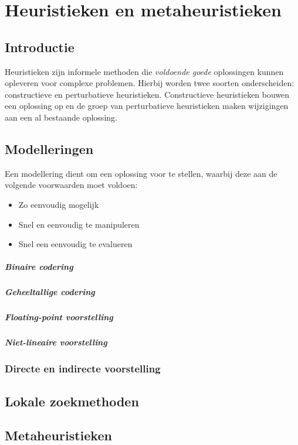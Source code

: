 \chapter{Heuristieken en metaheuristieken}

\section{Introductie}
Heuristieken zijn informele methoden die \emph{voldoende goede} oplossingen kunnen opleveren voor complexe problemen. 
Hierbij worden twee soorten onderscheiden: constructieve en perturbatieve heuristieken.
Constructieve heuristieken bouwen een oplossing op en de groep van perturbatieve heuristieken maken wijzigingen aan een al bestaande oplossing.

\section{Modelleringen}
Een modellering dient om een oplossing voor te stellen, waarbij deze aan de volgende voorwaarden moet voldoen:

\begin{itemize}
    \item Zo eenvoudig mogelijk
    \item Snel en eenvoudig te manipuleren
    \item Snel een eenvoudig te evalueren
\end{itemize}

\paragraph{Binaire codering}
\paragraph{Geheeltallige codering}
\paragraph{Floating-point voorstelling}
\paragraph{Niet-lineaire voorstelling}

\subsection{Directe en indirecte voorstelling}



\section{Lokale zoekmethoden}

\section{Metaheuristieken}
